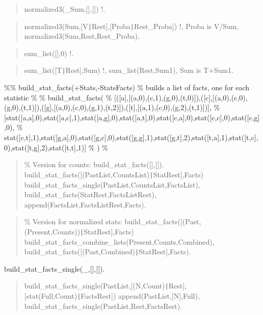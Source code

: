 \begin{quote}
normalized3(_Sum,[],[]) \Sneck{}
!.
\end{quote}

\begin{quote}
normalized3(Sum,[V{\tt\string|}Rest],[Proba{\tt\string|}Rest_Proba]) \Sneck{}
!,
Proba is V/Sum,
normalized3(Sum,Rest,Rest_Proba).
\end{quote}

\begin{quote}
sum_list([],0) \Sneck{}
!.
\end{quote}

\begin{quote}
sum_list([T{\tt\string|}Rest],Sum) \Sneck{}
!,
sum_list(Rest,Sum1),
Sum is T+Sum1.
\end{quote}

\%\% build_stat_facts(+Stats,-StatsFacts)
\% builds a list of facts, one for each statistic
\% \Sequal{}
\% build_stat_facts(
\% [([a],[(a,0),(c,1),(g,0),(t,0)]),([c],[(a,0),(c,0),(g,0),(t,1)]),([g],[(a,0),(c,0),(g,1),(t,2)]),([t],[(a,1),(c,0),(g,2),(t,1)])],
\% [stat([a,a],0),stat([a,c],1),stat([a,g],0),stat([a,t],0),stat([c,a],0),stat([c,c],0),stat([c,g],0),
\% stat([c,t],1),stat([g,a],0),stat([g,c],0),stat([g,g],1),stat([g,t],2),stat([t,a],1),stat([t,c],0),stat([t,g],2),stat([t,t],1)]
\% )
\% \Sequal{}

\begin{quote}
\% Version for counts:
build_stat_facts([],[]).
build_stat_facts([(PastList,CountsList){\tt\string|}StatRest],Facts) \Sneck{}
build_stat_facts_single(PastList,CountsList,FactsList),
build_stat_facts(StatRest,FactsListRest),
append(FactsList,FactsListRest,Facts).
\end{quote}

\begin{quote}
\% Version for normalized stats:
build_stat_facts([(Past,(Present,Counts)){\tt\string|}StatRest],Facts) \Sneck{}
build_stat_facts_combine_lists(Present,Counts,Combined),
build_stat_facts([(Past,Combined){\tt\string|}StatRest],Facts).
\end{quote}

build_stat_facts_single(_,[],[]).

\begin{quote}
build_stat_facts_single(PastList,[(N,Count){\tt\string|}Rest], [stat(Full,Count){\tt\string|}FactsRest]) \Sneck{}
append(PastList,[N],Full),
build_stat_facts_single(PastList,Rest,FactsRest).
\end{quote}

